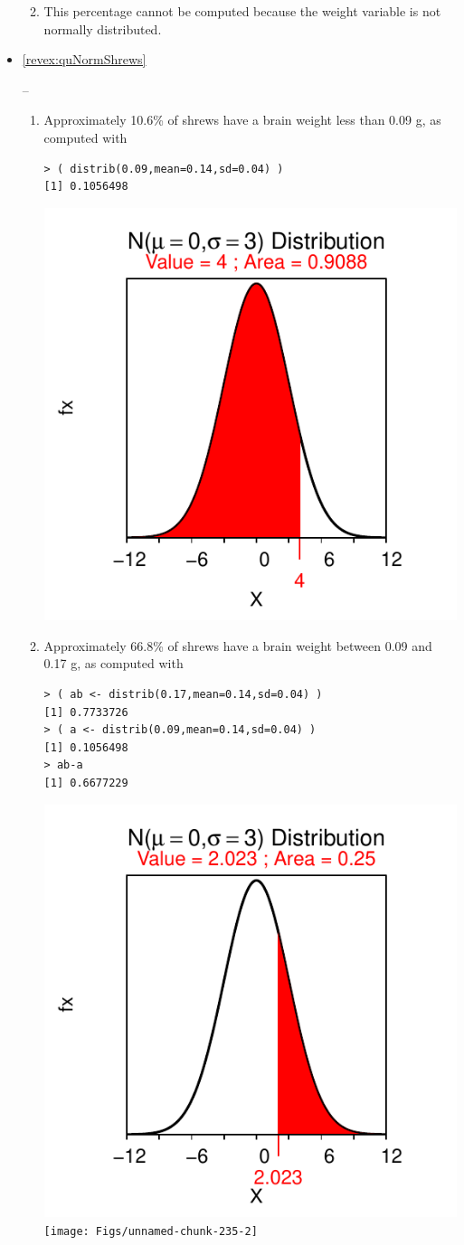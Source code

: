 \documentclass[10pt,openany]{book}\usepackage[]{graphicx}\usepackage[]{color}
\makeatletter
\newenvironment{kframe}{%
 \def\at@end@of@kframe{}%
 \ifinner\ifhmode%
  \def\at@end@of@kframe{\end{minipage}}%
  \begin{minipage}{\columnwidth}%
 \fi\fi%
 \def\FrameCommand##1{\hskip\@totalleftmargin \hskip-\fboxsep
 \colorbox{shadecolor}{##1}\hskip-\fboxsep
     \hskip-\linewidth \hskip-\@totalleftmargin \hskip\columnwidth}%
 \MakeFramed {\advance\hsize-\width
   \@totalleftmargin\z@ \linewidth\hsize
   \@setminipage}}%
 {\par\unskip\endMakeFramed%
 \at@end@of@kframe}
\newenvironment{knitrout}{}{} %
\makeatother
\begin{document}
\begin{itemize}
\begin{enumerate}
\begin{knitrout}
{}



\end{knitrout}
      \item This percentage cannot be computed because the weight variable is not normally distributed.
    \end{enumerate}

  \item \hypertarget{ans:quNormShrews}{\ref{revex:quNormShrews}} --
    \begin{enumerate}
      \item Approximately 10.6\% of shrews have a brain weight less than 0.09 g, as computed with
\begin{knitrout}
\color{fgcolor}\begin{kframe}
\begin{verbatim}
> ( distrib(0.09,mean=0.14,sd=0.04) )
[1] 0.1056498
\end{verbatim}
\end{kframe}

{\centering \includegraphics[width=.4\linewidth]{Figs/unnamed-chunk-234-1} 

}



\end{knitrout}
      \item Approximately 66.8\% of shrews have a brain weight between 0.09 and 0.17 g, as computed with
\begin{knitrout}
\color{fgcolor}\begin{kframe}
\begin{verbatim}
> ( ab <- distrib(0.17,mean=0.14,sd=0.04) )
[1] 0.7733726
> ( a <- distrib(0.09,mean=0.14,sd=0.04) )
[1] 0.1056498
> ab-a
[1] 0.6677229
\end{verbatim}
\end{kframe}

{\centering \includegraphics[width=.4\linewidth]{Figs/unnamed-chunk-235-1} 
\texttt{[image: Figs/unnamed-chunk-235-2]} 

}
\end{knitrout}
\end{enumerate}
\end{itemize}
\end{document}
